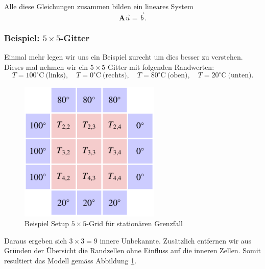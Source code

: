 Alle diese Gleichungen zusammen bilden ein lineares System
\[
\mathbf{A}\vec{u} = \vec{b}.
\]

\subsubsection{Beispiel: $5\times 5$-Gitter}

Einmal mehr legen wir uns ein Beispiel zurecht um dies besser zu verstehen. Dieses mal nehmen wir  ein $5\times 5$-Gitter mit folgenden Randwerten:
\[
T=100^\circ\mathrm{C}\ \text{(links)},\quad
T=0^\circ\mathrm{C}\ \text{(rechts)},\quad
T=80^\circ\mathrm{C}\ \text{(oben)},\quad
T=20^\circ\mathrm{C}\ \text{(unten)}.
\]

\begin{figure}[htbp]
	\centering
	\includegraphics[width=0.6\textwidth]{papers/parallelisierung/images/stationaer.pdf}
	\caption{Beispiel Setup $5\times5$-Grid für stationären Grenzfall}
	\label{parallelisierung:fig:stationaer}
\end{figure}
Daraus ergeben sich $3\times 3 = 9$ innere Unbekannte.
Zusätzlich entfernen wir aus Gründen der Übersicht die Randzellen ohne Einfluss auf die inneren Zellen. Somit resultiert das Modell gemäss Abbildung \ref{parallelisierung:fig:stationaer}.


